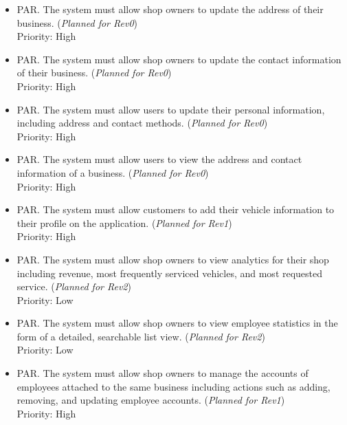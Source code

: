 \documentclass[12pt]{article}
\newcounter{parreqnum} %
\newcommand{\rev}[1]{(\textit{Planned for Rev#1})}
\begin{document}
\begin {itemize}
    
    \item[PAR\refstepcounter{parreqnum}\theparreqnum \label{R_Output}.] The system must allow shop owners to update the address of their business. \rev{0} \\
    Priority: High

    \item[PAR\refstepcounter{parreqnum}\theparreqnum \label{R_Output}.] The system must allow shop owners to update the contact information of their business. \rev{0} \\
    Priority: High

    \item[PAR\refstepcounter{parreqnum}\theparreqnum \label{R_Output}.] The system must allow users to update their personal information, including address and contact methods. \rev{0} \\
    Priority: High

    \item[PAR\refstepcounter{parreqnum}\theparreqnum \label{R_Output}.] The system must allow users to view the address and contact information of a business. \rev{0} \\
    Priority: High
    
    \item[PAR\refstepcounter{parreqnum}\theparreqnum \label{R_Output}.] The system must allow customers to add their vehicle information to their profile on the application. \rev{1} \\
    Priority: High
    
    \item[PAR\refstepcounter{ownerreqnum}\theparreqnum \label{R_Output}.] The system must allow shop owners to view analytics for their shop including revenue, most frequently serviced vehicles, and most requested service. \rev{2} \\
    Priority: Low

    \item[PAR\refstepcounter{parreqnum}\theparreqnum \label{R_Output}.] The system must allow shop owners to view employee statistics in the form of a detailed, searchable list view. \rev{2} \\
    Priority: Low

    \item[PAR\refstepcounter{parreqnum}\theparreqnum \label{R_Output}.] The system must allow shop owners to manage the accounts of employees attached to the same business including actions such as adding, removing, and updating employee accounts. \rev{1} \\
    Priority: High
    

\end{itemize}
\end{document}
